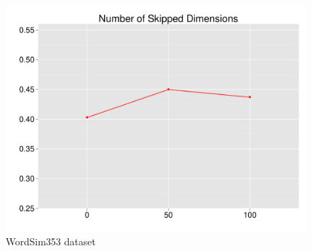 \documentclass[t]{beamer} %
\begin{document}
\begin{frame}
\begin{columns}
\begin{column}{0.5\textwidth}
      \begin{figure}
        \hspace*{-18pt}   
        \includegraphics[scale=0.30]{img/lapesa_ws_main_dimskip}
        \vspace{-10pt}
        \caption{WordSim353 dataset}
      \end{figure}
      
    \end{column}
  \end{columns}  
  
\end{frame}
\end{document}
